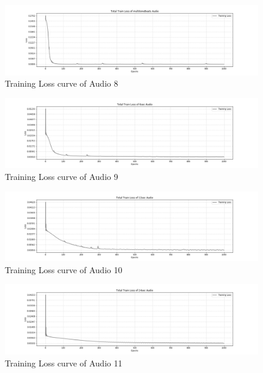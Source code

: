 \documentclass{ioereport}
\begin{document}
    \begin{figure}[H]
        \centering
        \includegraphics[width=\linewidth]{assets/audio_results/loss_curve/training_loss_curve_multitoneBeats.png}
        \caption{Training Loss curve of Audio 8}
        \label{fig:loss-curve-8}
    \end{figure}
    \begin{figure}[H]
        \centering
        \includegraphics[width=\linewidth]{assets/audio_results/loss_curve/training_loss_curve_06.png}
        \caption{Training Loss curve of Audio 9}
        \label{fig:loss-curve-9}
    \end{figure}
    \begin{figure}[H]
        \centering
        \includegraphics[width=\linewidth]{assets/audio_results/loss_curve/training_loss_curve_12.png}
        \caption{Training Loss curve of Audio 10}
        \label{fig:loss-curve-10}
    \end{figure}
    \begin{figure}[H]
        \centering
        \includegraphics[width=\linewidth]{assets/audio_results/loss_curve/training_loss_curve_24.png}
        \caption{Training Loss curve of Audio 11}
        \label{fig:loss-curve-11}
    \end{figure}
\end{document}
